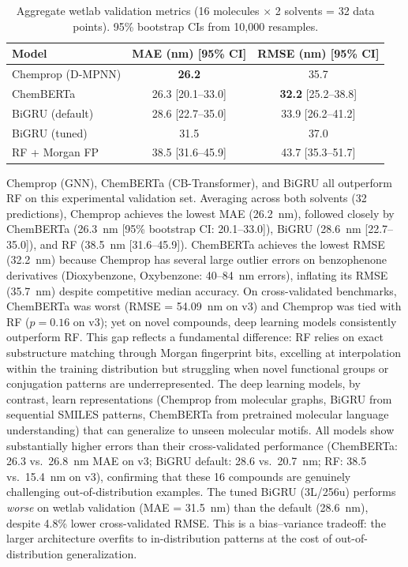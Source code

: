 \documentclass[journal=jcisd8,manuscript=article]{achemso}
\begin{document}
\begin{table}[htbp]
\centering
\caption{Aggregate wetlab validation metrics (16 molecules $\times$ 2 solvents = 32 data points). 95\% bootstrap CIs from 10,000 resamples.}
\label{tab:wetlab_summary}
\begin{tabular}{lcc}
\toprule
\textbf{Model} & \textbf{MAE (nm) [95\% CI]} & \textbf{RMSE (nm) [95\% CI]} \\
\midrule
Chemprop (D-MPNN) & \textbf{26.2} & 35.7 \\
ChemBERTa & 26.3 [20.1--33.0] & \textbf{32.2} [25.2--38.8] \\
BiGRU (default) & 28.6 [22.7--35.0] & 33.9 [26.2--41.2] \\
BiGRU (tuned) & 31.5 & 37.0 \\
RF + Morgan FP & 38.5 [31.6--45.9] & 43.7 [35.3--51.7] \\
\bottomrule
\end{tabular}
\end{table}

Chemprop (GNN), ChemBERTa (CB-Transformer), and BiGRU all outperform RF on this experimental validation set. Averaging across both solvents (32 predictions), Chemprop achieves the lowest MAE (26.2~nm), followed closely by ChemBERTa (26.3~nm [95\% bootstrap CI: 20.1--33.0]), BiGRU (28.6~nm [22.7--35.0]), and RF (38.5~nm [31.6--45.9]).
ChemBERTa achieves the lowest RMSE (32.2~nm) because Chemprop has several large outlier errors on benzophenone derivatives (Dioxybenzone, Oxybenzone: 40--84~nm errors), inflating its RMSE (35.7~nm) despite competitive median accuracy.
On cross-validated benchmarks, ChemBERTa was worst (RMSE = 54.09~nm on v3) and Chemprop was tied with RF ($p = 0.16$ on v3); yet on novel compounds, deep learning models consistently outperform RF.
This gap reflects a fundamental difference: RF relies on exact substructure matching through Morgan fingerprint bits, excelling at interpolation within the training distribution but struggling when novel functional groups or conjugation patterns are underrepresented.
The deep learning models, by contrast, learn representations (Chemprop from molecular graphs, BiGRU from sequential SMILES patterns, ChemBERTa from pretrained molecular language understanding) that can generalize to unseen molecular motifs.
All models show substantially higher errors than their cross-validated performance (ChemBERTa: 26.3 vs.\ 26.8~nm MAE on v3; BiGRU default: 28.6 vs.\ 20.7~nm; RF: 38.5 vs.\ 15.4~nm on v3), confirming that these 16 compounds are genuinely challenging out-of-distribution examples.
The tuned BiGRU (3L/256u) performs \textit{worse} on wetlab validation (MAE = 31.5~nm) than the default (28.6~nm), despite 4.8\% lower cross-validated RMSE. This is a bias--variance tradeoff: the larger architecture overfits to in-distribution patterns at the cost of out-of-distribution generalization.
\end{document}

